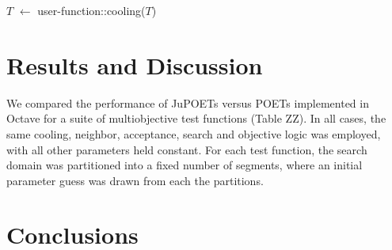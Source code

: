 \documentclass{bmcart}
\begin{document}
\begin{algorithm}[h!]
{    \BlankLine
    $T$ $\leftarrow$ user-function::cooling($T$)\;
 }
\vspace{0.05in}
\caption{Pseudo-code for the run-loop of the JuPOETs algorithm. The user specifies the neighbor, acceptance, cooling and objective function pointers along with a initial parameter guess.
The rank archive $\mathcal{R}$, solution archive $\mathcal{S}$ and objective archive $\mathcal{O}$ are initialized from the initial guess.
The initial guess is then perturbed in the neighbor function, which generates a new solution whose performance is evaluated using the user supplied objective function.
The new solution and objective values are then added to the respective archives and ranked using the builtin rank function.
If the new solution accepted (based upon a probability calculated with the user supplied acceptance function) it is added to the solution and objective archive. This solution is then perturbed during the next iteration of the algorithm.
However, if the solution is not accepted, it is removed from the archive and discarded. The computational temperature is adjusted using the user supplied cooling function after each $\mathcal{I}$ iterations. }\label{algo:JuPOETs-pcode}
\end{algorithm}

\clearpage

\section*{Results and Discussion}
We compared the performance of JuPOETs versus POETs implemented in Octave for a suite of multiobjective test functions (Table ZZ).
In all cases, the same cooling, neighbor, acceptance, search and objective logic was employed, with all other parameters held constant.
For each test function, the search domain was partitioned into a fixed number of segments, where an initial parameter guess was drawn from each the partitions.




\section*{Conclusions}

\end{document}
